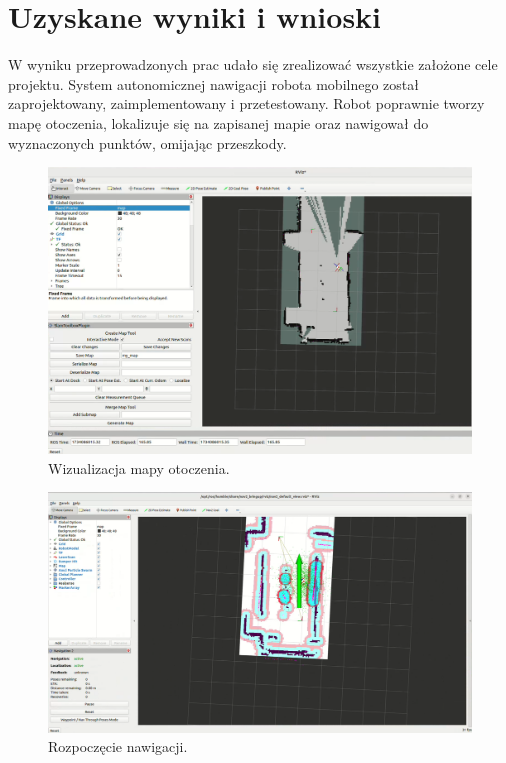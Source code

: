 \documentclass[a4paper,twoside,12pt]{book}
\begin{document}
\section{Uzyskane wyniki i wnioski}
W wyniku przeprowadzonych prac udało się zrealizować wszystkie założone cele projektu. System autonomicznej nawigacji robota mobilnego został zaprojektowany, zaimplementowany i przetestowany. Robot poprawnie tworzy mapę otoczenia, lokalizuje się na zapisanej mapie oraz nawigował do wyznaczonych punktów, omijając przeszkody. 
\begin{figure}[!hb]
	\centering
	\includegraphics[width=1\textwidth]{images/save-map.png}
	\caption{Wizualizacja mapy otoczenia.}
	\label{fig:save-map2}
\end{figure}
\newpage
\begin{figure}[!hb]
	\centering
	\includegraphics[width=1\textwidth]{images/launch-nav3.png}
	\caption{Rozpoczęcie nawigacji.}
	\label{fig:nav-map34}
\end{figure}
\end{document}
